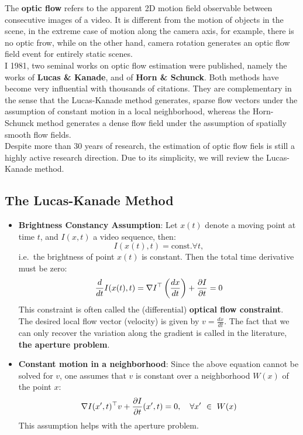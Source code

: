 The \textbf{optic flow} refers to the apparent 2D motion field observable
between consecutive images of a video.
It is different from the motion of objects in the scene,
in the extreme case of motion along the camera axis, for example,
there is no optic frow, while on the other hand, camera rotation
generates an optic flow field event for entirely static scenes.\\

I 1981, two seminal works on optic flow estimation were published,
namely the works of \textbf{Lucas \& Kanade}, and of
\textbf{Horn \& Schunck}. Both methods have become very influential
with thousands of citations. They are complementary in the sense
that the Lucas-Kanade method generates, sparse flow vectors
under the assumption of constant motion in a local neighborhood,
whereas the Horn-Schunck method generates a dense flow field under
the assumption of spatially smooth flow fields.\\

Despite more than 30 years of research, the estimation of optic flow
fiels is still a highly active research direction.
Due to its simplicity, we will review the Lucas-Kanade method.


\subsection{The Lucas-Kanade Method}%
\label{sub:the_lucas_kanade_method}


\begin{itemize}
	\item \textbf{Brightness Constancy Assumption}:
		Let $x(t)$ denote a moving point at time $t$, and $I(x,t)$
		a video sequence, then:
		\[
			I(x(t),t) = \text{const.} \forall t,
		\]
		i.e.\ the brightness of point $x(t)$ is constant.
		Then the total time derivative must be zero:
		\[
			\frac{d}{dt} I(x(t),t)
			= \nabla I^{\top} \left(\frac{dx}{dt}\right)
				+ \frac{\partial I}{\partial t}
			= 0
		\]
		This constraint is often called the (differential)
		\textbf{optical flow constraint}. The desired local flow vector
		(velocity) is given by $v = \frac{dx}{dt}$.
		The fact that we can only recover the variation along
		the gradient is called in the literature,
		\textbf{the aperture problem}.

	\item \textbf{Constant motion in a neighborhood}:
		Since the above equation cannot be solved for $v$,
		one assumes that $v$ is constant over a neighborhood $W(x)$
		of the point $x$:
		\[
			\nabla I (x',t)^{\top} v + \frac{\partial I}{\partial t}(x',t)
				= 0,\quad \forall x'\ \in\ W(x)
		\]
		This assumption helps with the aperture problem.
\end{itemize}

